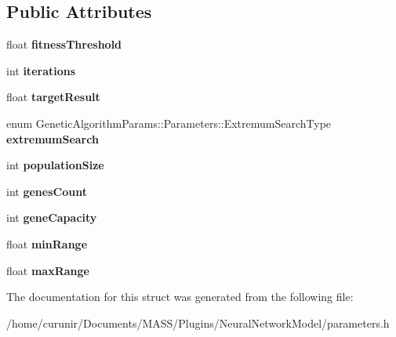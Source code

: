 \subsection*{Public Attributes}
\begin{DoxyCompactItemize}
\item 
float {\bfseries fitness\+Threshold}\hypertarget{struct_genetic_algorithm_params_1_1_parameters_a2d4b36153aa65aed6fa0996f17e73c36}{}\label{struct_genetic_algorithm_params_1_1_parameters_a2d4b36153aa65aed6fa0996f17e73c36}

\item 
int {\bfseries iterations}\hypertarget{struct_genetic_algorithm_params_1_1_parameters_a130a1e03f3a445caa0e0a00d6f2f21fd}{}\label{struct_genetic_algorithm_params_1_1_parameters_a130a1e03f3a445caa0e0a00d6f2f21fd}

\item 
float {\bfseries target\+Result}\hypertarget{struct_genetic_algorithm_params_1_1_parameters_ad9bde581bef9239129cfdbe2d78ff514}{}\label{struct_genetic_algorithm_params_1_1_parameters_ad9bde581bef9239129cfdbe2d78ff514}

\item 
enum Genetic\+Algorithm\+Params\+::\+Parameters\+::\+Extremum\+Search\+Type {\bfseries extremum\+Search}\hypertarget{struct_genetic_algorithm_params_1_1_parameters_a51c4b0811c004fe1419d9a20bd014ba7}{}\label{struct_genetic_algorithm_params_1_1_parameters_a51c4b0811c004fe1419d9a20bd014ba7}

\item 
int {\bfseries population\+Size}\hypertarget{struct_genetic_algorithm_params_1_1_parameters_a8355f423b6b1015ff239b59ef391b067}{}\label{struct_genetic_algorithm_params_1_1_parameters_a8355f423b6b1015ff239b59ef391b067}

\item 
int {\bfseries genes\+Count}\hypertarget{struct_genetic_algorithm_params_1_1_parameters_a3e988ba9f53c8ca2338c2b12e05e54de}{}\label{struct_genetic_algorithm_params_1_1_parameters_a3e988ba9f53c8ca2338c2b12e05e54de}

\item 
int {\bfseries gene\+Capacity}\hypertarget{struct_genetic_algorithm_params_1_1_parameters_a8cdc92e995b4f84fb7f80b9348f193fe}{}\label{struct_genetic_algorithm_params_1_1_parameters_a8cdc92e995b4f84fb7f80b9348f193fe}

\item 
float {\bfseries min\+Range}\hypertarget{struct_genetic_algorithm_params_1_1_parameters_a2f70a84e27bbecc6b032c1cc73052fca}{}\label{struct_genetic_algorithm_params_1_1_parameters_a2f70a84e27bbecc6b032c1cc73052fca}

\item 
float {\bfseries max\+Range}\hypertarget{struct_genetic_algorithm_params_1_1_parameters_ae6366f636b54fa8753bc4117dab9392f}{}\label{struct_genetic_algorithm_params_1_1_parameters_ae6366f636b54fa8753bc4117dab9392f}

\end{DoxyCompactItemize}


The documentation for this struct was generated from the following file\+:\begin{DoxyCompactItemize}
\item 
/home/curunir/\+Documents/\+M\+A\+S\+S/\+Plugins/\+Neural\+Network\+Model/parameters.\+h\end{DoxyCompactItemize}
